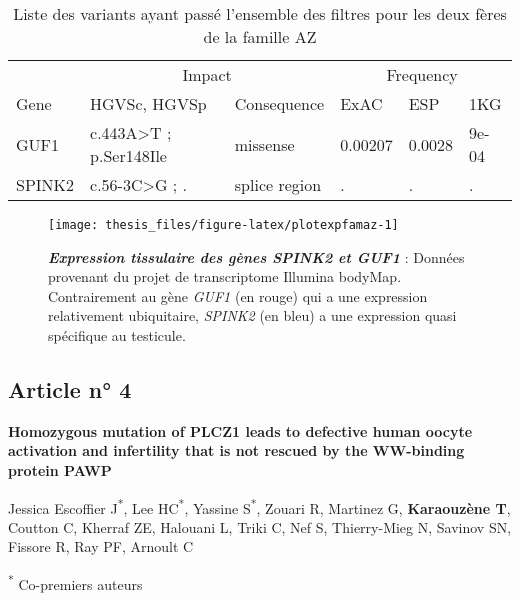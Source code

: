 \documentclass[12pt,twoside]{ugathesis}
\begin{document}
\begin{longtable}[t]{llllll}
\caption{\label{tab:tabrecapaz}Liste des variants ayant passé l'ensemble des filtres pour les deux fères de la famille AZ}\\
\toprule
\multicolumn{1}{c}{ } & \multicolumn{2}{c}{Impact} & \multicolumn{3}{c}{Frequency} \\
\cmidrule(l{2pt}r{2pt}){2-3} \cmidrule(l{2pt}r{2pt}){4-6}
Gene & HGVSc, HGVSp & Consequence & ExAC & ESP & 1KG\\
\midrule
GUF1 & c.443A>T ; p.Ser148Ile & missense & 0.00207 & 0.0028 & 9e-04\\
SPINK2 & c.56-3C>G ; . & splice region & . & . & .\\
\bottomrule
\end{longtable}

\begin{figure}

{\centering \texttt{[image: thesis\_files/figure-latex/plotexpfamaz-1]} 

}

\caption[Expression tissulaire des gènes \emph{SPINK2} et
\emph{GUF1}]{\textbf{\emph{Expression tissulaire des gènes
\emph{SPINK2} et \emph{GUF1}}} : Données provenant du projet de
transcriptome Illumina bodyMap. Contrairement au gène \emph{GUF1} (en
rouge) qui a une expression relativement ubiquitaire, \emph{SPINK2} (en
bleu) a une expression quasi spécifique au testicule.}\label{fig:plotexpfamaz}
\end{figure}










\newpage

\subsection{Article n° 4}\label{article-n-4}

\textbf{Homozygous mutation of PLCZ1 leads to defective human oocyte
activation and infertility that is not rescued by the WW-binding protein
PAWP}

Jessica Escoffier J\textsuperscript{*}, Lee HC\textsuperscript{*},
Yassine S\textsuperscript{*}, Zouari R, Martinez G, \textbf{Karaouzène
T}, Coutton C, Kherraf ZE, Halouani L, Triki C, Nef S, Thierry-Mieg N,
Savinov SN, Fissore R, Ray PF, Arnoult C

\textsuperscript{*} Co-premiers auteurs
\end{document}
